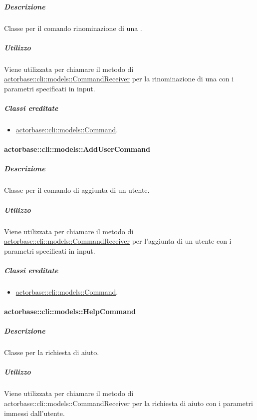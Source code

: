 \documentclass{scalatekids-article}
\begin{document}
\subparagraph{Descrizione}

Classe per il comando rinominazione di una .

\subparagraph{Utilizzo}

Viene utilizzata per chiamare il metodo di \hyperref[sec:actorbase::cli::models::CommandReceiver]{actorbase::cli::models::CommandReceiver} per la rinominazione di una  con i parametri specificati in input.

\subparagraph{Classi ereditate}

\begin{itemize}
\item \hyperref[sec:actorbase::cli::models::Command]{actorbase::cli::models::Command}.
\end{itemize}

\paragraph{actorbase::cli::models::AddUserCommand}
\label{sec:actorbase::cli::models::AddUserCommand}

\subparagraph{Descrizione}

Classe per il comando di aggiunta di un utente.

\subparagraph{Utilizzo}

Viene utilizzata per chiamare il metodo di
\hyperref[sec:actorbase::cli::models::CommandReceiver]{actorbase::cli::models::CommandReceiver} per l'aggiunta di un utente con i
parametri specificati in input.

\subparagraph{Classi ereditate}

\begin{itemize}
\item \hyperref[sec:actorbase::cli::models::Command]{actorbase::cli::models::Command}.
\end{itemize}

\paragraph{actorbase::cli::models::HelpCommand}
\label{sec:actorbase::cli::models::HelpCommand}

\subparagraph{Descrizione}

Classe per la richiesta di aiuto.

\subparagraph{Utilizzo}

Viene utilizzata per chiamare il metodo di
actorbase::cli::models::CommandReceiver per la richiesta di aiuto con i
parametri immessi dall'utente.
\end{document}
